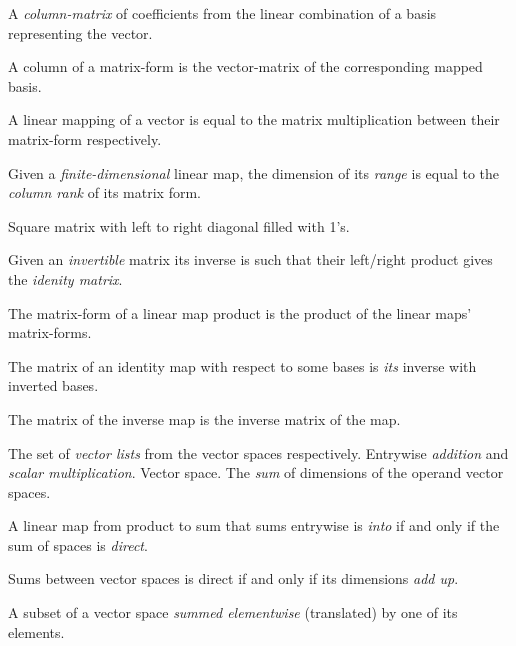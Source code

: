 \begin{multicols}{3}
  A \textit{column-matrix} of coefficients from the linear combination of a basis representing the vector.

  A column of a matrix-form is the vector-matrix of the corresponding mapped basis.
  
  A linear mapping of a vector is equal to the matrix multiplication between their matrix-form respectively.
  
  Given a \textit{finite-dimensional} linear map,
  the dimension of its \textit{range} is equal to
  the \textit{column rank} of its matrix form.
  
  Square matrix with left to right diagonal filled with 1's.

  Given an \textit{invertible} matrix its inverse is such that their left/right product gives the \textit{idenity matrix}.

  The matrix-form of a linear map product is the product of the linear maps' matrix-forms.
  
  The matrix of an identity map with respect to some bases is
  \textit{its} inverse with inverted bases.
  
    
  The matrix of the inverse map is the inverse matrix of the map.


  The set of \textit{vector lists} from the vector spaces respectively.
  Entrywise \textit{addition} and \textit{scalar multiplication}.
   Vector space.
  The \textit{sum} of dimensions of the operand vector spaces.

  A linear map from product to sum that sums entrywise is
  \textit{into} if and only if the sum of spaces is \textit{direct}.

  Sums between vector spaces is direct if and only if its dimensions \textit{add up}.

  A subset of a vector space \textit{summed elementwise} (translated) by one of its elements.


\end{multicols}

